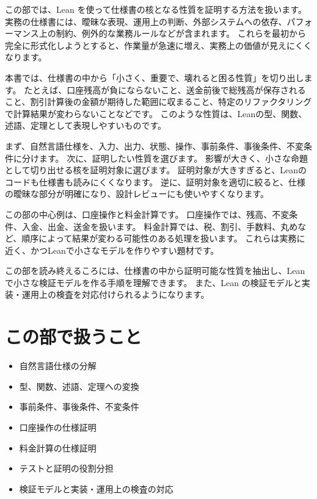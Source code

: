 
この部では、Lean を使って仕様書の核となる性質を証明する方法を扱います。
実務の仕様書には、曖昧な表現、運用上の判断、外部システムへの依存、パフォーマンス上の制約、例外的な業務ルールなどが含まれます。
これらを最初から完全に形式化しようとすると、作業量が急速に増え、実務上の価値が見えにくくなります。

本書では、仕様書の中から「小さく、重要で、壊れると困る性質」を切り出します。
たとえば、口座残高が負にならないこと、送金前後で総残高が保存されること、割引計算後の金額が期待した範囲に収まること、特定のリファクタリングで計算結果が変わらないことなどです。
このような性質は、Leanの型、関数、述語、定理として表現しやすいものです。

まず、自然言語仕様を、入力、出力、状態、操作、事前条件、事後条件、不変条件に分けます。
次に、証明したい性質を選びます。
影響が大きく、小さな命題として切り出せる核を証明対象に選びます。
証明対象が大きすぎると、Leanのコードも仕様書も読みにくくなります。
逆に、証明対象を適切に絞ると、仕様の曖昧な部分が明確になり、設計レビューにも使いやすくなります。

この部の中心例は、口座操作と料金計算です。
口座操作では、残高、不変条件、入金、出金、送金を扱います。
料金計算では、税、割引、手数料、丸めなど、順序によって結果が変わる可能性のある処理を扱います。
これらは実務に近く、かつLeanで小さなモデルを作りやすい題材です。

この部を読み終えるころには、仕様書の中から証明可能な性質を抽出し、Leanで小さな検証モデルを作る手順を理解できます。
また、Lean の検証モデルと実装・運用上の検査を対応付けられるようになります。

\section*{この部で扱うこと}

\begin{itemize}
\item 自然言語仕様の分解
\item 型、関数、述語、定理への変換
\item 事前条件、事後条件、不変条件
\item 口座操作の仕様証明
\item 料金計算の仕様証明
\item テストと証明の役割分担
\item 検証モデルと実装・運用上の検査の対応
\end{itemize}
